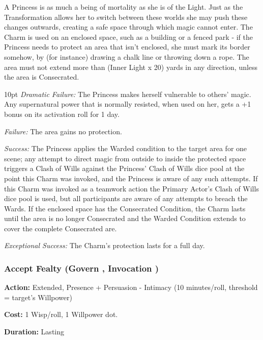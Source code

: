 \noindent A Princess is as much a being of mortality as she is of the Light. Just as the Transformation allows her to switch between these worlds she may push these changes outwards, creating a safe space through which magic cannot enter. The Charm is used on an enclosed space, such as a building or a fenced park - if the Princess needs to protect an area that isn't enclosed, she must mark its border somehow, by (for instance) drawing a chalk line or throwing down a rope. The area must not extend more than (Inner Light x 20) yards in any direction, unless the area is Consecrated.

\begin{myindentpar}{10pt}    \emph{Dramatic Failure:} The Princess makes herself vulnerable to others' magic. Any supernatural power that is normally resisted, when used on her, gets a +1 bonus on its activation roll for 1 day.

    \emph{Failure:} The area gains no protection.

    \emph{Success:} The Princess applies the Warded condition to the target area for one scene; any attempt to direct magic from outside to inside the protected space triggers a Clash of Wills against the Princess' Clash of Wills dice pool at the point this Charm was invoked, and the Princess is aware of any such attempts. If this Charm was invoked as a teamwork action the Primary Actor's Clash of Wills dice pool is used, but all participants are aware of any attempts to breach the Wards. If the enclosed space has the Consecrated Condition, the Charm lasts until the area is no longer Consecrated and the Warded Condition extends to cover the complete Consecrated are.

    \emph{Exceptional Success:} The Charm's protection lasts for a full day.\end{myindentpar}


\subsubsection*{Accept Fealty (Govern \textbullet\textbullet, Invocation \textbullet\textbullet\textbullet)}

\noindent \textbf{Action:} Extended, Presence + Persuasion - Intimacy (10 minutes/roll, threshold = target's Willpower)

\noindent \textbf{Cost:} 1 Wisp/roll, 1 Willpower dot.

\noindent \textbf{Duration:} Lasting \\


